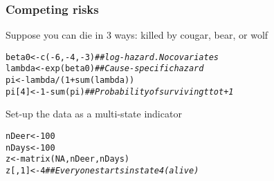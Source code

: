 \documentclass[color=usenames,dvipsnames]{beamer}\usepackage[]{graphicx}\usepackage[]{xcolor}
\makeatletter
\newcommand{\hlnum}[1]{\textcolor[rgb]{0.69,0.494,0}{#1}}%
\newcommand{\hlcom}[1]{\textcolor[rgb]{0.514,0.506,0.514}{\textit{#1}}}%
\newcommand{\hlopt}[1]{\textcolor[rgb]{0,0,0}{#1}}%
\newcommand{\hldef}[1]{\textcolor[rgb]{0,0,0}{#1}}%
\newcommand{\hlkwb}[1]{\textcolor[rgb]{0,0.341,0.682}{#1}}%
\newcommand{\hlkwd}[1]{\textcolor[rgb]{0.004,0.004,0.506}{#1}}%
\newenvironment{kframe}{%
 \def\at@end@of@kframe{}%
 \ifinner\ifhmode%
  \def\at@end@of@kframe{\end{minipage}}%
  \begin{minipage}{\columnwidth}%
 \fi\fi%
 \def\FrameCommand##1{\hskip\@totalleftmargin \hskip-\fboxsep
 \colorbox{shadecolor}{##1}\hskip-\fboxsep
     \hskip-\linewidth \hskip-\@totalleftmargin \hskip\columnwidth}%
 \MakeFramed {\advance\hsize-\width
   \@totalleftmargin\z@ \linewidth\hsize
   \@setminipage}}%
 {\par\unskip\endMakeFramed%
 \at@end@of@kframe}
\newenvironment{knitrout}{}{} %
\makeatother
\begin{document}
\begin{frame}[fragile]
  \frametitle{Competing risks}
  Suppose you can die in 3 ways: killed by cougar, bear, or wolf
\begin{knitrout}\small
{}\color{fgcolor}\begin{kframe}
\begin{alltt}
\hldef{beta0} \hlkwb{<-} \hlkwd{c}\hldef{(}\hlopt{-}\hlnum{6}\hldef{,} \hlopt{-}\hlnum{4}\hldef{,} \hlopt{-}\hlnum{3}\hldef{)} \hlcom{## log-hazard. No covariates}
\hldef{lambda} \hlkwb{<-} \hlkwd{exp}\hldef{(beta0)}   \hlcom{## Cause-specific hazard}
\hldef{pi} \hlkwb{<-} \hldef{lambda} \hlopt{/} \hldef{(}\hlnum{1}\hlopt{+}\hlkwd{sum}\hldef{(lambda))}
\hldef{pi[}\hlnum{4}\hldef{]} \hlkwb{<-} \hlnum{1}\hlopt{-}\hlkwd{sum}\hldef{(pi)}     \hlcom{## Probability of surviving t to t+1}
\end{alltt}
\end{kframe}
\end{knitrout}
\pause
\vfill
  Set-up the data as a multi-state indicator
\begin{knitrout}\small
{}\color{fgcolor}\begin{kframe}
\begin{alltt}
\hldef{nDeer} \hlkwb{<-} \hlnum{100}
\hldef{nDays} \hlkwb{<-} \hlnum{100}
\hldef{z} \hlkwb{<-} \hlkwd{matrix}\hldef{(}\hlnum{NA}\hldef{, nDeer, nDays)}
\hldef{z[,}\hlnum{1}\hldef{]} \hlkwb{<-} \hlnum{4}  \hlcom{## Everyone starts in state 4 (alive)}
\end{alltt}
\end{kframe}
\end{knitrout}
\end{frame}
\end{document}
